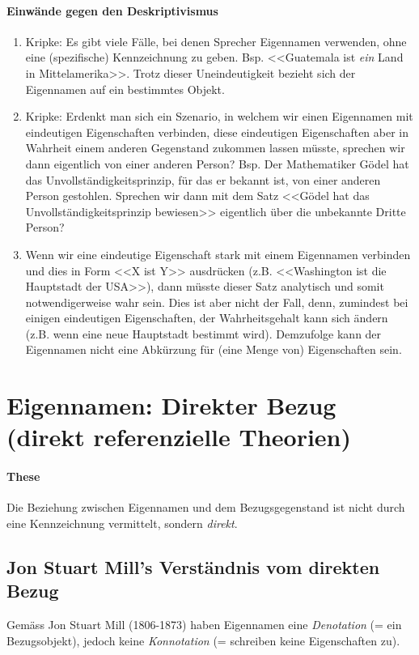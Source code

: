 \documentclass[../main.tex]{subfiles}
\begin{document}
\paragraph{Einwände gegen den Deskriptivismus}
\begin{enumerate}
	\item Kripke: Es gibt viele Fälle, bei denen Sprecher Eigennamen verwenden, ohne eine (spezifische) Kennzeichnung zu geben. Bsp. <<Guatemala ist \textit{ein} Land in Mittelamerika>>. Trotz dieser Uneindeutigkeit bezieht sich der Eigennamen auf ein bestimmtes Objekt. 
	\item Kripke: Erdenkt man sich ein Szenario, in welchem wir einen Eigennamen mit eindeutigen Eigenschaften verbinden, diese eindeutigen Eigenschaften aber in Wahrheit einem anderen Gegenstand zukommen lassen müsste, sprechen wir dann eigentlich von einer anderen Person? Bsp. Der Mathematiker Gödel hat das Unvollständigkeitsprinzip, für das er bekannt ist, von einer anderen Person gestohlen. Sprechen wir dann mit dem Satz <<Gödel hat das Unvollständigkeitsprinzip bewiesen>> eigentlich über die unbekannte Dritte Person?
	\item Wenn wir eine eindeutige Eigenschaft stark mit einem Eigennamen verbinden und dies in Form <<X ist Y>> ausdrücken (z.B. <<Washington ist die Hauptstadt der USA>>), dann müsste dieser Satz analytisch und somit notwendigerweise wahr sein. Dies ist aber nicht der Fall, denn, zumindest bei einigen eindeutigen Eigenschaften, der Wahrheitsgehalt kann sich ändern (z.B. wenn eine neue Hauptstadt bestimmt wird). Demzufolge kann der Eigennamen nicht eine Abkürzung für (eine Menge von) Eigenschaften sein. 
\end{enumerate}

\section{Eigennamen: Direkter Bezug (direkt referenzielle Theorien)}

\paragraph{These} Die Beziehung zwischen Eigennamen und dem Bezugsgegenstand ist nicht durch eine Kennzeichnung vermittelt, sondern \textit{direkt}.

\subsection{Jon Stuart Mill's Verständnis vom direkten Bezug}
Gemäss Jon Stuart Mill (1806-1873) haben Eigennamen eine \textit{Denotation} (= ein Bezugsobjekt), jedoch keine \textit{Konnotation} (= schreiben keine Eigenschaften zu).
\end{document}

